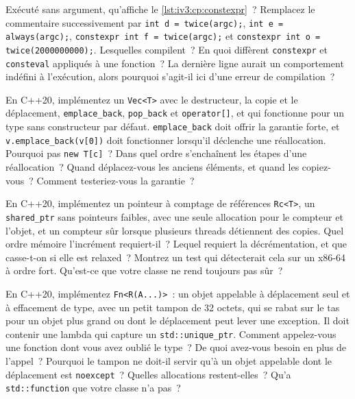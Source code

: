 \begin{question}\label{iq:iv3:cpp:55}
Exécuté sans argument, qu'affiche le \cref{lst:iv3:cp:constexpr}~? Remplacez le commentaire successivement par \texttt{int d = twice(argc);}, \texttt{int e = always(argc);}, \texttt{constexpr int f = twice(argc);} et \texttt{constexpr int o = twice(2000000000);}. Lesquelles compilent~? En quoi diffèrent \texttt{constexpr} et \texttt{consteval} appliqués à une fonction~? La dernière ligne aurait un comportement indéfini à l'exécution, alors pourquoi s'agit-il ici d'une erreur de compilation~?
\label{lst:iv3:cp:constexpr}
\end{question}

\begin{question}\label{iq:iv3:cpp:56}
En C++20, implémentez un \texttt{Vec<T>} avec le destructeur, la copie et le déplacement, \texttt{emplace\_back}, \texttt{pop\_back} et \texttt{operator[]}, et qui fonctionne pour un type sans constructeur par défaut. \texttt{emplace\_back} doit offrir la garantie forte, et \texttt{v.emplace\_back(v[0])} doit fonctionner lorsqu'il déclenche une réallocation. Pourquoi pas \texttt{new T[c]}~? Dans quel ordre s'enchaînent les étapes d'une réallocation~? Quand déplacez-vous les anciens éléments, et quand les copiez-vous~? Comment testeriez-vous la garantie~?
\end{question}

\begin{question}\label{iq:iv3:cpp:57}
En C++20, implémentez un pointeur à comptage de références \texttt{Rc<T>}, un \texttt{shared\_ptr} sans pointeurs faibles, avec une seule allocation pour le compteur et l'objet, et un compteur sûr lorsque plusieurs threads détiennent des copies. Quel ordre mémoire l'incrément requiert-il~? Lequel requiert la décrémentation, et que casse-t-on si elle est relaxed~? Montrez un test qui détecterait cela sur un x86-64 à ordre fort. Qu'est-ce que votre classe ne rend toujours pas sûr~?
\end{question}

\begin{question}\label{iq:iv3:cpp:58}
En C++20, implémentez \texttt{Fn<R(A.{}.{}.)>}~: un objet appelable à déplacement seul et à effacement de type, avec un petit tampon de 32 octets, qui se rabat sur le tas pour un objet plus grand ou dont le déplacement peut lever une exception. Il doit contenir une lambda qui capture un \texttt{std::unique\_ptr}. Comment appelez-vous une fonction dont vous avez oublié le type~? De quoi avez-vous besoin en plus de l'appel~? Pourquoi le tampon ne doit-il servir qu'à un objet appelable dont le déplacement est \texttt{noexcept}~? Quelles allocations restent-elles~? Qu'a \texttt{std::function} que votre classe n'a pas~?
\end{question}

